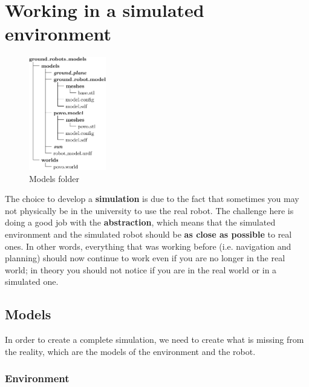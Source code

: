 
\chapter{Working in a simulated environment}
\label{cha:simworld}

\noindent\begin{figure}
    \includegraphics[width=0.3\textwidth]{images/models_folder}
    \caption{Models folder}
\end{figure}
The choice to develop a \textbf{simulation} is due to the fact that sometimes you may not physically be in the university to use the real robot. The challenge here is doing a good job with the \textbf{abstraction}, which means that the simulated environment and the simulated robot should be \textbf{as close as possible} to real ones. In other words, everything that was working before (i.e. navigation and planning) should now continue to work even if you are no longer in the real world; in theory you should not notice if you are in the real world or in a simulated one.

\section{Models}

In order to create a complete simulation, we need to create what is missing from the reality, which are the models of the environment and the robot.

\subsection{Environment}
\label{sub:map}

